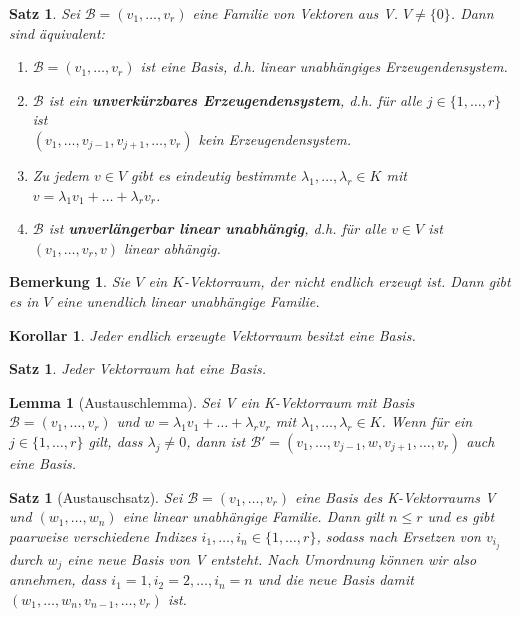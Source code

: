 \documentclass[12pt,a4paper]{article}
\theoremstyle{plain}
\newtheorem{Satz}[Theorem]{Satz}
\newtheorem{Lemma}[Theorem]{Lemma}
\newtheorem{Korollar}[Theorem]{Korollar}
\newtheorem{Bemerkung}[Theorem]{Bemerkung}
\newcommand{\herv}[1]{{\emph{\textbf{#1}}}}
\numberwithin{equation}{section}
\begin{document}
\begin{Satz}
Sei $\mathcal{B}=(v_1,\ldots,v_r)$ eine Familie von Vektoren aus V. $V\neq \{0\}$. Dann sind äquivalent:
\begin{enumerate}
\renewcommand{\labelenumi}{\emph{(\roman{enumi})}}
\item $\mathcal{B}=(v_1,\ldots,v_r)$ ist eine Basis, d.h. linear unabhängiges Erzeugendensystem.
\item $\mathcal{B}$ ist ein \herv{unverkürzbares Erzeugendensystem}, d.h. für alle $j\in \{1,\ldots,r\}$ ist \\ $(v_1,\ldots,v_{j-1},v_{j+1},\ldots,v_r)$ kein Erzeugendensystem.
\item Zu jedem $v\in V$ gibt es eindeutig bestimmte $\lambda_1,\ldots,\lambda_r\in K$ mit $v=\lambda_1 v_1+\ldots+\lambda_r v_r$.
\item $\mathcal{B}$ ist \herv{unverlängerbar linear unabhängig}, d.h. für alle $v\in V$ ist $(v_1,\ldots,v_r,v)$ linear abhängig. 
\end{enumerate}
\end{Satz}
\begin{Bemerkung}
Sie $V$ ein $K$-Vektorraum, der nicht endlich erzeugt ist. Dann gibt es in $V$ eine unendlich linear unabhängige Familie.
\end{Bemerkung}
\begin{Korollar}
Jeder endlich erzeugte Vektorraum besitzt eine Basis.
\end{Korollar}
\begin{Satz}
Jeder Vektorraum hat eine Basis.
\end{Satz}
\begin{Lemma}[Austauschlemma]
Sei V ein K-Vektorraum mit Basis $\mathcal{B}=(v_1,\ldots,v_r)$ und $w=\lambda_1 v_1+\ldots+\lambda_r v_r$ mit $\lambda_1,\ldots,\lambda_r\in K$. Wenn für ein $j\in\{1,\ldots,r\}$ gilt, dass $\lambda_j\neq 0$, dann ist $\mathcal{B}'=(v_1,\ldots,v_{j-1},w,v_{j+1},\ldots,v_r)$ auch eine Basis.
\end{Lemma}
\begin{Satz}[Austauschsatz]
Sei $\mathcal{B}=(v_1,\ldots,v_r)$ eine Basis des K-Vektorraums V und $(w_1,\ldots,w_n)$ eine linear unabhängige Familie. Dann gilt $n\leq r$ und es gibt paarweise verschiedene Indizes $i_1,\ldots,i_n\in \{1,\ldots,r\}$, sodass nach Ersetzen von $v_{i_j}$ durch $w_j$ eine neue Basis von V entsteht. Nach Umordnung können wir also annehmen, dass $i_1=1,i_2=2,\ldots,i_n=n$ und die neue  Basis damit $(w_1,\ldots,w_n,v_{n-1},\ldots,v_r)$ ist.
\end{Satz}
\end{document}
